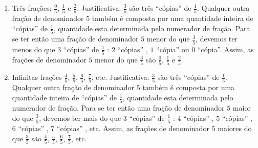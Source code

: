 \begin{multicols}{2}
\begin{orientacoes}{}{}
\begin{center}
\end{center}



\end{orientacoes}

\begin{solucao}{}{}
\begin{enumerate} [\quad a)] %
    \item       Três frações:       $\frac{0}{5}$,       $\frac{1}{5}$       e
    $\frac{2}{5}$. Justificativa:       $\frac{3}{5}$       são três
``cópias''       de       $\frac{1}{5}$. Qualquer outra fração de denominador
   $5$       também é composta por uma quantidade inteira de       ``cópias''
   de       $\frac{1}{5}$, quantidade esta determinada pelo numerador de fração.
Para se ter então uma fração de denominador       $5$       menor do que
$\frac{3}{5}$, devemos ter menos do que       $3$             ``cópias''
de       $\frac{1}{5}$      :       $2$             ``cópias''      ,       $1$
           ``cópia''       ou       $0$             ``cópia''. Assim, as
frações de denominador       $5$       menor do que       $\frac{3}{5}$
são       $\frac{0}{5}$,       $\frac{1}{5}$       e       $\frac{2}{5}$.
    \item       Infinitas frações       $\frac{4}{5}$,       $\frac{5}{5}$,
 $\frac{6}{5}$,       $\frac{7}{5}$, etc. Justificativa:       $\frac{3}{5}$
  são três       ``cópias''       de       $\frac{1}{5}$. Qualquer outra fração
de denominador       $5$       também é composta por uma quantidade inteira de
    ``cópias''       de       $\frac{1}{5}$, quantidade esta determinada pelo
numerador de fração. Para se ter então uma fração de denominador       $5$
maior do que       $\frac{3}{5}$, devemos ter mais do que       $3$
``cópias''       de       $\frac{1}{5}$      :       $4$             ``cópias''
    ,       $5$             ``cópias''      ,       $6$             ``cópias''
   ,       $7$             ``cópias''      , etc. Assim, as frações de
denominador       $5$       maiores do que       $\frac{3}{5}$       são
$\frac{4}{5}$,       $\frac{5}{5}$,       $\frac{6}{5}$,       $\frac{7}{5}$,
etc.
\end{enumerate} %


\end{solucao}
\end{multicols}
